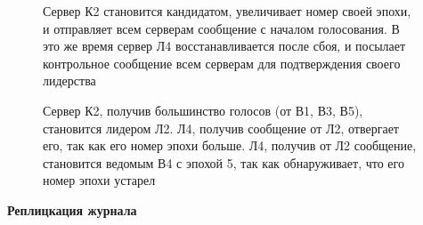 \documentclass[subf, href, colorlinks=true, 14pt,
times, mtpro, specialist]{disser}
\theoremstyle{definition}
\begin{document}
\begin{figure}[H]
\begin{minipage}[h]{0.46\linewidth}
\begin{small}
Сервер К2 становится кандидатом, увеличивает номер своей эпохи, и отправляет всем серверам сообщение с началом голосования. В это же время сервер Л4 восстанавливается после сбоя, и посылает контрольное сообщение всем серверам для подтверждения своего лидерства \\
\end{small}
\end{minipage}
\hfill
\begin{minipage}[h]{0.46\linewidth}
\begin{small}
Сервер К2, получив большинство голосов (от В1, В3, В5), становится лидером Л2. Л4, получив сообщение от Л2, отвергает его, так как его номер эпохи больше. Л4, получив от Л2 сообщение,
становится ведомым В4 с эпохой 5, так как обнаруживает, что его номер эпохи устарел \\
\end{small}
\end{minipage}
\caption{}
\label{fig:elec}
\end{figure}

\textbf{Реплицкация журнала}
\end{document}
